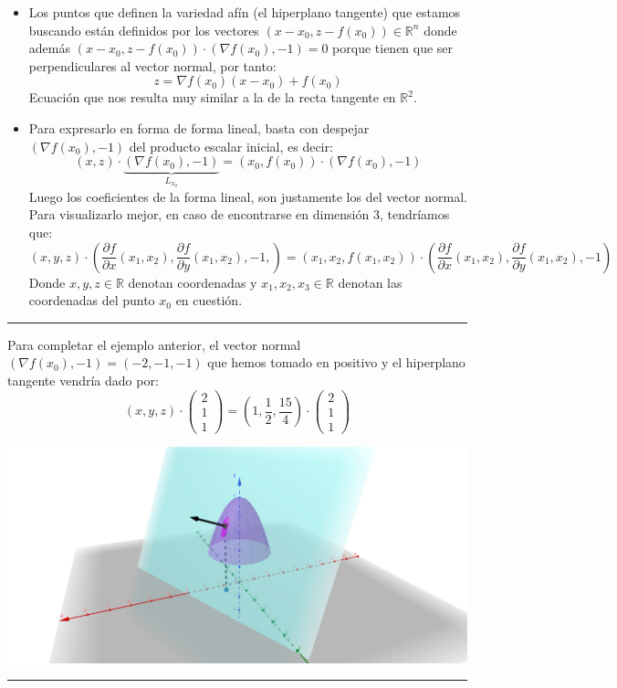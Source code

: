 \documentclass[10pt,a4paper,openright]{book}
\theoremstyle{break}
\begin{document}
\begin{itemize}
\item Los puntos que definen la variedad afín (el hiperplano tangente) que estamos buscando están definidos por los vectores $(x-x_0, z-f(x_0))\in \mathbb{R}^n$ donde además $(x-x_0, z-f(x_0))\cdot (\nabla f(x_0), -1) = 0$ porque tienen que ser perpendiculares al vector normal, por tanto:
$$z=\nabla f (x_0)(x-x_0)+ f(x_0)$$
Ecuación que nos resulta muy similar a la de la recta tangente en $\mathbb{R}^2$.

\item Para expresarlo en forma de forma lineal, basta con despejar $(\nabla f(x_0), -1)$ del producto escalar inicial, es decir:
$$(x,z)\cdot \underbrace{(\nabla f(x_0), -1)}_{L_{x_0}} = (x_0, f(x_0))\cdot (\nabla f(x_0), -1)$$
Luego los coeficientes de la forma lineal, son justamente los del vector normal. Para visualizarlo mejor, en caso de encontrarse en dimensión 3, tendríamos que:
$$(x,y,z)\cdot \left(\frac{\partial f}{\partial x}(x_1,x_2), \frac{\partial f}{\partial y}(x_1,x_2), -1,\right) = (x_1, x_2, f(x_1,x_2))\cdot \left(\frac{\partial f}{\partial x}(x_1,x_2), \frac{\partial f}{\partial y}(x_1,x_2), -1\right)$$
Donde $x,y,z\in \mathbb{R}$ denotan coordenadas y $x_1, x_2, x_3\in \mathbb{R}$ denotan las coordenadas del punto $x_0$ en cuestión.
\end{itemize}
\hrule
Para completar el ejemplo anterior, el vector normal $(\nabla f(x_0), -1)= (-2,-1,-1)$ que hemos tomado en positivo y el hiperplano tangente vendría dado por:
$$(x,y,z)\cdot \begin{pmatrix} 2 \\ 1 \\ 1\end{pmatrix} = \left(1,\frac{1}{2}, \frac{15}{4}\right)\cdot \begin{pmatrix} 2 \\ 1 \\ 1\end{pmatrix}$$

\begin{center}
\includegraphics[scale=0.21]{diferencial2}
\end{center}
\hrule
\end{document}
